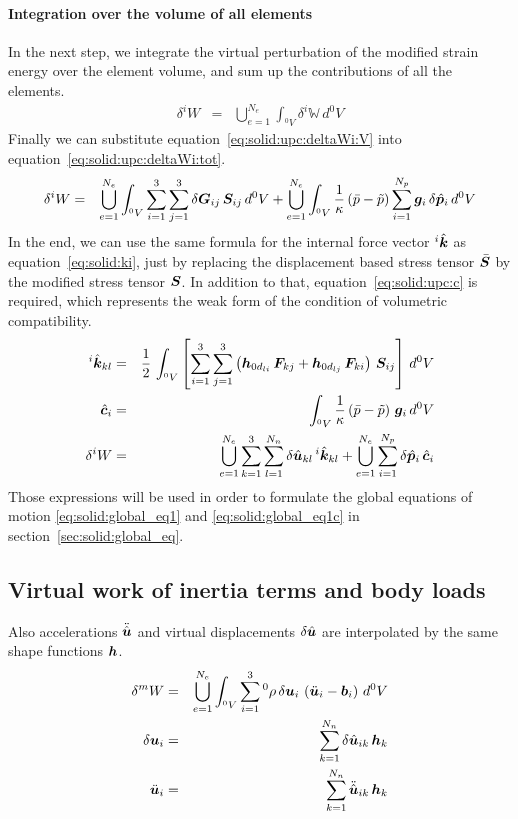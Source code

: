 \paragraph{Integration over the volume of all elements}
In the next step, we integrate the virtual perturbation of the modified strain energy over the element volume,
and sum up the contributions of all the elements.
\begin{eqnarray}
\delta^iW & = & \bigcup_{e=1}^{N_e}\int_{^0V} \delta^i\mathbb{W} \, d^0V \label{eq:solid:upc:deltaWi:tot}
\end{eqnarray}
Finally we can substitute equation~\ref{eq:solid:upc:deltaWi:V} into equation~\ref{eq:solid:upc:deltaWi:tot}.
\begin{eqnarray}
\delta^iW & = & \bigcup_{e=1}^{N_e}\int_{^0V} \sum_{i=1}^{3}\sum_{j=1}^{3} \delta\boldsymbol{G}_{ij}\,\boldsymbol{S}_{ij} \, d^0V
          + \bigcup_{e=1}^{N_e}\int_{^0V} \frac{1}{\kappa}\left(\bar{p} - \tilde{p}\right)\sum_{i=1}^{N_p} \bm{g}_i \, \delta\hat{\bm{p}}_i \, d^0V
\end{eqnarray}
In the end, we can use the same formula for the internal force vector ${}^i\hat{\bm{k}}$ as equation~\ref{eq:solid:ki},
just by replacing the displacement based stress tensor $\bar{\bm{S}}$ by the modified stress tensor $\bm{S}$.
In addition to that, equation~\ref{eq:solid:upc:c} is required, which represents the weak form of the condition of volumetric compatibility.
\begin{eqnarray}
^i\hat{\bm{k}}_{kl} & = & \frac{1}{2} \, \int_{^0V} \left[ \sum_{i=1}^3 \sum_{j=1}^3 \left(\bm{h}_{0d_{li}} \, \bm{F}_{kj} + \bm{h}_{0d_{lj}} \, \bm{F}_{ki}\right) \, \bm{S}_{ij} \right] \, d^0V \\
\hat{\bm{c}}_i & = &\int_{^0V} \frac{1}{\kappa}\left(\bar{p} - \tilde{p}\right) \, \bm{g}_i \, d^0V \label{eq:solid:upc:c} \\
\delta^iW & = & \bigcup_{e=1}^{N_e}\sum_{k=1}^{3} \sum_{l=1}^{N_n} \delta \hat{\bm{u}}_{kl} \, ^i\hat{\bm{k}}_{kl}
            +  \bigcup_{e=1}^{N_e} \sum_{i=1}^{N_p} \delta\hat{\bm{p}}_i \, \hat{\bm{c}}_i
\end{eqnarray}
Those expressions will be used in order to formulate the global equations of motion \ref{eq:solid:global_eq1} and \ref{eq:solid:global_eq1c} in section~\ref{sec:solid:global_eq}.
\subsection{Virtual work of inertia terms and body loads}
Also accelerations $\ddot{\hat{\bm{u}}}$ and virtual displacements $\delta\hat{\bm{u}}$ are interpolated by the same shape functions $\bm{h}$.
\begin{eqnarray}
\delta^{m}W & = & \bigcup_{e=1}^{N_e} \int_{^0V} \sum_{i=1}^3 {^0}\rho \, \delta\bm{u}_i \, \left(\ddot{\bm{u}}_i - \bm{b}_i\right) \, d^0V \label{eq:solid:delta_Wm} \\
\delta\bm{u}_i & = & \sum_{k=1}^{N_n} \delta\hat{\bm{u}}_{ik} \, \bm{h}_k \label{eq:solid:delta_u} \\
\ddot{\bm{u}}_i & = & \sum_{k=1}^{N_n} \ddot{\hat{\bm{u}}}_{ik} \, \bm{h}_k \label{eq:solid:delta_ddotu}
\end{eqnarray}

